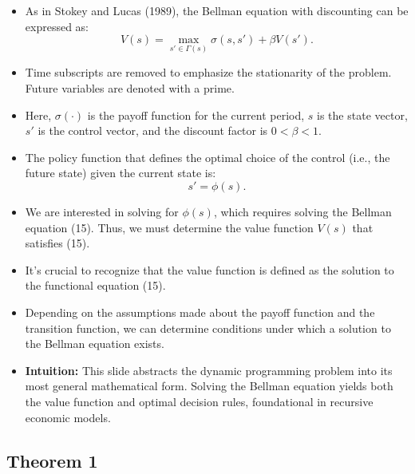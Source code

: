 \documentclass[12pt]{article}
\begin{document}
\begin{itemize}
\item As in Stokey and Lucas (1989), the Bellman equation with discounting can be expressed as:
\[
V(s) = \max_{s' \in \Gamma(s)} \sigma(s, s') + \beta V(s'). \tag{15}
\]

\item Time subscripts are removed to emphasize the stationarity of the problem. Future variables are denoted with a prime.

\item Here, $\sigma(\cdot)$ is the payoff function for the current period, $s$ is the state vector, $s'$ is the control vector, and the discount factor is $0 < \beta < 1$.

\item The policy function that defines the optimal choice of the control (i.e., the future state) given the current state is:
\[
s' = \phi(s). \tag{16}
\]

\item We are interested in solving for $\phi(s)$, which requires solving the Bellman equation (15). Thus, we must determine the value function $V(s)$ that satisfies (15).

\item It's crucial to recognize that the value function is defined as the solution to the functional equation (15).

\item Depending on the assumptions made about the payoff function and the transition function, we can determine conditions under which a solution to the Bellman equation exists.

\item \textbf{Intuition:} This slide abstracts the dynamic programming problem into its most general mathematical form. Solving the Bellman equation yields both the value function and optimal decision rules, foundational in recursive economic models.
\end{itemize}

\subsection*{\noindent\textbf{Theorem 1}}
\end{document}
